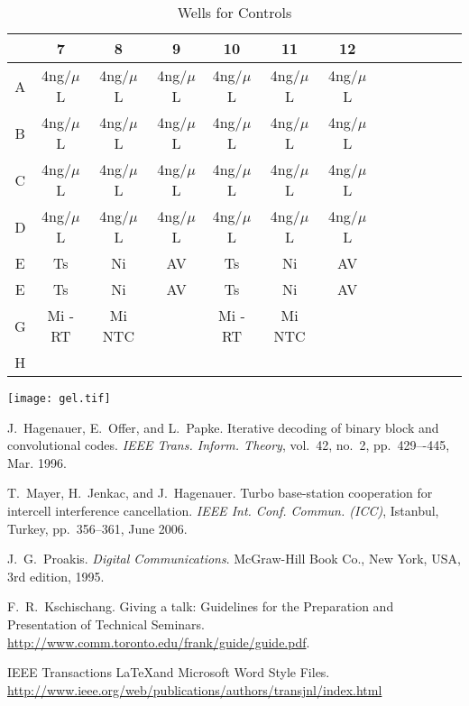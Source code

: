 \documentclass[journal, a4paper]{IEEEtran}
\begin{document}


  \begin{table}[!hbt]
    \begin{center}
    \caption{Wells for Controls}
    \label{tab:simParameters}
    \begin{tabular}{|c|c|c|c|c|c|c|c|c|c|c|c|c|}
      \hline
      & 7 & 8 & 9 & 10 & 11 & 12 \\
      \hline
      A & 4ng/$\mu$L & 4ng/$\mu$L & 4ng/$\mu$L & 4ng/$\mu$L & 4ng/$\mu$L & 4ng/$\mu$L\\
      \hline
      B & 4ng/$\mu$L & 4ng/$\mu$L & 4ng/$\mu$L & 4ng/$\mu$L & 4ng/$\mu$L & 4ng/$\mu$L\\
      \hline
      C & 4ng/$\mu$L & 4ng/$\mu$L & 4ng/$\mu$L & 4ng/$\mu$L & 4ng/$\mu$L & 4ng/$\mu$L\\
      \hline
      D & 4ng/$\mu$L & 4ng/$\mu$L & 4ng/$\mu$L & 4ng/$\mu$L & 4ng/$\mu$L & 4ng/$\mu$L\\
      \hline
      E & Ts & Ni & AV & Ts & Ni & AV\\
      \hline
      E & Ts & Ni & AV & Ts & Ni & AV\\
      \hline
      G & Mi -RT & Mi NTC & & Mi -RT & Mi NTC & \\
      \hline
      H & & & & & &\\
      \hline
    \end{tabular}
    \end{center}
  \end{table}

\texttt{[image: gel.tif]}

\begin{thebibliography}{5}
    J.~Hagenauer, E.~Offer, and L.~Papke. Iterative decoding of binary block
    and convolutional codes. {\em IEEE Trans. Inform. Theory},
    vol.~42, no.~2, pp.~429–-445, Mar. 1996.

    T.~Mayer, H.~Jenkac, and J.~Hagenauer. Turbo base-station cooperation for intercell interference cancellation. {\em IEEE Int. Conf. Commun. (ICC)}, Istanbul, Turkey, pp.~356--361, June 2006.

    J.~G.~Proakis. {\em Digital Communications}. McGraw-Hill Book Co.,
    New York, USA, 3rd edition, 1995.

    F.~R.~Kschischang. Giving a talk: Guidelines for the Preparation and Presentation of Technical Seminars.
    \url{http://www.comm.toronto.edu/frank/guide/guide.pdf}.

    IEEE Transactions \LaTeX and Microsoft Word Style Files.
    \url{http://www.ieee.org/web/publications/authors/transjnl/index.html}

\end{thebibliography}

\end{document}
